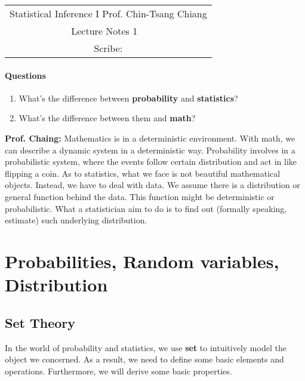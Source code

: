 \documentclass[Probability_Theory.tex]{subfiles}
\begin{document}
	\begin{center}
		\renewcommand{\arraystretch}{2}
		\begin{bfseries}
			\begin{tabular}{|c|}
				\hline
				Statistical Inference I \hfill Prof. Chin-Tsang Chiang\\
				\hspace{15em} {\large Lecture Notes 1} \hspace{15em}\ \\
				\lecdate \hfill Scribe: \scribe\\
				\hline
			\end{tabular}
			\renewcommand{\arraystretch}{1}
		\end{bfseries}
	\end{center}
\paragraph{Questions}
\begin{enumerate}
	\item What's the difference between {\bf probability} and {\bf statistics}?
	\item What's the difference between them and {\bf math}?
\end{enumerate}
{\bf Prof. Chaing:}
Mathematics is in a  {\color{red} deterministic}  environment. With math, we can describe a dynamic system in a deterministic way. Probability involves in a probabilistic system, where the events follow certain distribution and act in like flipping a coin. As to statistics, what we face is not beautiful mathematical objects. Instead, we have to deal with {\color{red} data}. We assume there is a distribution or general function behind the data. This function might be deterministic or probabilistic. What a statistician aim to do is to find out (formally speaking, estimate) such underlying distribution.

\section{Probabilities, Random variables, Distribution}
\subsection{Set Theory}
In the world of probability and statistics, we use {\bf set} to intuitively model the object we concerned. As a result, we need to define some basic elements and operations. Furthermore, we will derive some basic properties.
\end{document}
